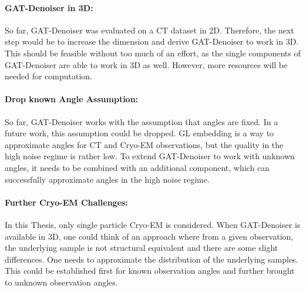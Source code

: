 \paragraph{GAT-Denoiser in 3D:}
So far, GAT-Denoiser was evaluated on a CT dataset in 2D.
Therefore, the next step would be to increase the dimension and 
derive GAT-Denoiser to work in 3D. This should be feasible without too much of an effort,
as the single components of GAT-Denoiser are able to work in 3D as well. 
However, more resources will be needed for computation.

\paragraph{Drop known Angle Assumption:}
So far, GAT-Denoiser works with the assumption that angles are fixed.
In a future work, this assumption could be dropped. GL embedding
is a way to approximate angles for CT and Cryo-EM observations, but the quality in the high noise regime is rather low.
To extend GAT-Denoiser to work with unknown angles, it needs to be combined with an additional component, 
which can successfully approximate angles in the high noise regime.

\paragraph{Further Cryo-EM Challenges:}
In this Thesis, only single particle Cryo-EM is considered.
When GAT-Denoiser is available in 3D, one could think of an approach
where from a given observation, the underlying sample is not 
structural equivalent and there are some slight differences. 
One needs to approximate the distribution of the underlying samples.
This could be established first for known observation angles and further brought to unknown observation angles.

